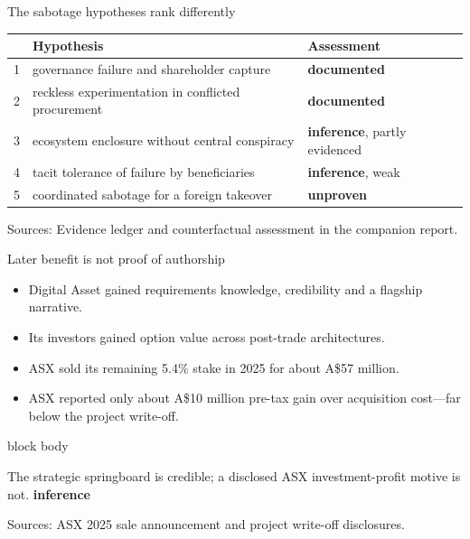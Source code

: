 \documentclass[aspectratio=169,12pt]{beamer}
\newcommand{\source}[1]{\vfill\par\fontsize{5.4}{6.5}\selectfont\color{Quiet}Sources: #1}
\newcommand{\tightitems}{\setlength{\itemsep}{0.42em}\setlength{\parskip}{0pt}}
\newcommand{\tdoc}{\textcolor{Sage}{\bfseries documented}}
\newcommand{\tinf}{\textcolor{Ocean}{\bfseries inference}}
\newcommand{\tunp}{\textcolor{Quiet}{\bfseries unproven}}
\newenvironment{statement}{%
  \begin{beamercolorbox}[sep=.18cm,rounded=false,wd=\linewidth]{block body}%
  \fontsize{13}{15.5}\selectfont\bfseries
}{\end{beamercolorbox}}
\begin{document}
\begin{frame}{The sabotage hypotheses rank differently}
  \fontsize{9.8}{11.8}\selectfont
  \begin{tabularx}{\textwidth}{L{0.55cm}Y L{3.0cm}}
    \toprule
    & \textbf{Hypothesis} & \textbf{Assessment} \\
     & governance failure and shareholder capture & \tdoc \\
    2 & reckless experimentation in conflicted procurement & \tdoc \\
    3 & ecosystem enclosure without central conspiracy & \tinf, partly evidenced \\
    4 & tacit tolerance of failure by beneficiaries & \tinf, weak \\
    5 & coordinated sabotage for a foreign takeover & \tunp \\
    \bottomrule
  \end{tabularx}
  \source{Evidence ledger and counterfactual assessment in the companion report.}
\end{frame}

\begin{frame}{Later benefit is not proof of authorship}
  \begin{itemize}\tightitems
    \item Digital Asset gained requirements knowledge, credibility and a flagship narrative.
    \item Its investors gained option value across post-trade architectures.
    \item ASX sold its remaining 5.4\% stake in 2025 for about A\$57 million.
    \item ASX reported only about A\$10 million pre-tax gain over acquisition cost---far below the project write-off.
  \end{itemize}
  \begin{statement}
    The strategic springboard is credible; a disclosed ASX investment-profit motive is not. \hfill\tinf
  \end{statement}
  \source{ASX 2025 sale announcement and project write-off disclosures.}
\end{frame}
\end{document}
